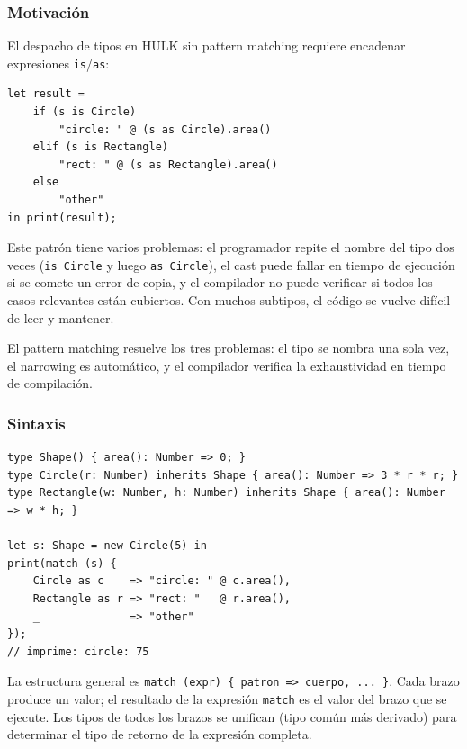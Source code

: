 \documentclass[12pt,letterpaper]{article}
\newcommand{\hulk}{\textsc{HULK}}
\newcommand{\src}[1]{\texttt{#1}}
\begin{document}
\subsubsection{Motivación}

El despacho de tipos en \hulk{} sin pattern matching requiere encadenar expresiones \src{is}/\src{as}:

\begin{lstlisting}[language=HULK,caption={Despacho de tipos sin pattern matching: verboso y propenso a errores}]
let result =
    if (s is Circle)
        "circle: " @ (s as Circle).area()
    elif (s is Rectangle)
        "rect: " @ (s as Rectangle).area()
    else
        "other"
in print(result);
\end{lstlisting}

Este patrón tiene varios problemas: el programador repite el nombre del tipo dos veces (\src{is Circle} y luego \src{as Circle}), el cast puede fallar en tiempo de ejecución si se comete un error de copia, y el compilador no puede verificar si todos los casos relevantes están cubiertos. Con muchos subtipos, el código se vuelve difícil de leer y mantener.

El pattern matching resuelve los tres problemas: el tipo se nombra una sola vez, el narrowing es automático, y el compilador verifica la exhaustividad en tiempo de compilación.

\subsubsection{Sintaxis}

\begin{lstlisting}[language=HULK,caption={Sintaxis de match: scrutinee, patrones y cuerpos de brazo}]
type Shape() { area(): Number => 0; }
type Circle(r: Number) inherits Shape { area(): Number => 3 * r * r; }
type Rectangle(w: Number, h: Number) inherits Shape { area(): Number => w * h; }

let s: Shape = new Circle(5) in
print(match (s) {
    Circle as c    => "circle: " @ c.area(),
    Rectangle as r => "rect: "   @ r.area(),
    _              => "other"
});
// imprime: circle: 75
\end{lstlisting}

La estructura general es \src{match (expr) \{ patron => cuerpo, ... \}}. Cada brazo produce un valor; el resultado de la expresión \src{match} es el valor del brazo que se ejecute. Los tipos de todos los brazos se unifican (tipo común más derivado) para determinar el tipo de retorno de la expresión completa.
\end{document}
